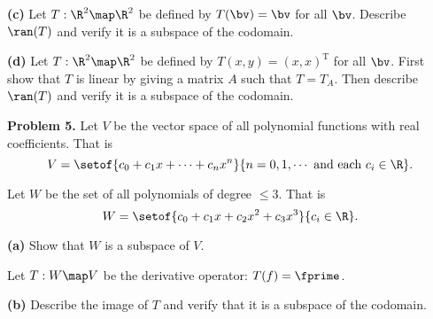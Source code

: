 \documentclass[oneside,12pt]{amsart}
\begin{document}
\textbf{(c)} Let $T:\R^2\map\R^2$ be defined by $T(\bv) = \bv$ for
all $\bv$. Describe $\ran(T)$ and verify it is a subspace of the codomain.

\bigskip
\bigskip
\bigskip
\bigskip
\bigskip
\bigskip
\bigskip
\bigskip
\bigskip
\bigskip

\textbf{(d)} Let $T:\R^2\map\R^2$ be defined by
$T(x,y) = (x, x)^{\text{T}}$ for
all $\bv$.  First show that $T$ is linear by giving a matrix $A$ such that
$T=T_A$. Then describe $\ran(T)$ and verify it is a subspace of the codomain.

\bigskip
\bigskip
\bigskip
\bigskip
\bigskip
\bigskip
\bigskip
\bigskip
\bigskip
\bigskip


\textbf{Problem 5.} Let $V$ be the vector space of all polynomial functions
with real coefficients. That is
$$V=\setof{c_0 +c_1 x + \cdots + c_n x^n}{n=0,1,\cdots \text{ and each } c_i\in\R}.$$

\smallskip

Let $W$ be the set of all polynomials of degree $\leq 3$. That is
$$W=\setof{c_0 +c_1 x + c_2 x^2 + c_3 x^3}{c_i\in\R}.$$

\bigskip

\textbf{(a)} Show that $W$ is a subspace of $V$.

\bigskip
\bigskip
\bigskip
\bigskip
\bigskip
\bigskip
\bigskip
\bigskip
\bigskip
\bigskip


Let $T:W\map V$ be the derivative operator: $T(f) = \fprime$.

\bigskip

\textbf{(b)} Describe the image of $T$ and verify that it is a subspace
of the codomain.
\end{document}
